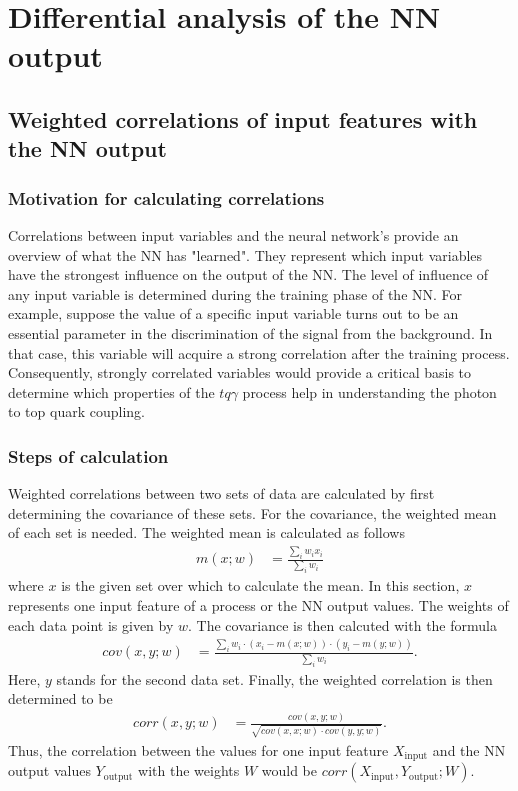 \chapter{Differential analysis of the NN output}
\section{Weighted correlations of input features with the NN output}

\subsection{Motivation for calculating correlations}
Correlations between input variables and the neural network's provide an overview of what the NN has "learned". 
They represent which input variables have the strongest influence on the output of the NN. 
The level of influence of any input variable is determined during the training phase of the NN. For example, suppose the value of a specific input variable turns out to be an essential parameter in the discrimination of the signal from the background. 
In that case, this variable will acquire a strong correlation after the training process. 
Consequently, strongly correlated variables would provide a critical basis to determine which properties of the $tq\gamma$ process help in understanding the photon to top quark coupling.  \\

\subsection{Steps of calculation}

Weighted correlations between two sets of data are calculated by first determining the covariance of these sets. For the covariance, the weighted mean of each set is needed. 
The weighted mean is calculated as follows
\begin{align*}
    m(x;w) &= \frac{\sum_i{w_i x_i}}{\sum_i{ w_i}}
\end{align*}
where $x$ is the given set over which to calculate the mean. In this section, $x$ represents one input feature of a process or the NN output values. The weights of each data point is given by $w$. 
The covariance is then calcuted with the formula 
\begin{align*}
    cov(x,y;w) &= \frac{\sum_i{w_i \cdot (x_i - m(x;w)) \cdot (y_i - m(y;w))}}{\sum_i{w_i}}.
\end{align*}
Here, $y$ stands for the second data set. Finally, the weighted correlation is then determined to be 
\begin{align*}
    corr(x,y;w) &= \frac{cov(x,y;w)}{\sqrt{cov(x,x;w)\cdot cov(y,y;w)}}.
\end{align*}
Thus, the correlation between the values for one input feature $X_\text{input}$ and the NN output values $Y_\text{output}$ with the weights $W$ would be $corr(X_\text{input},Y_\text{output};W)$.


